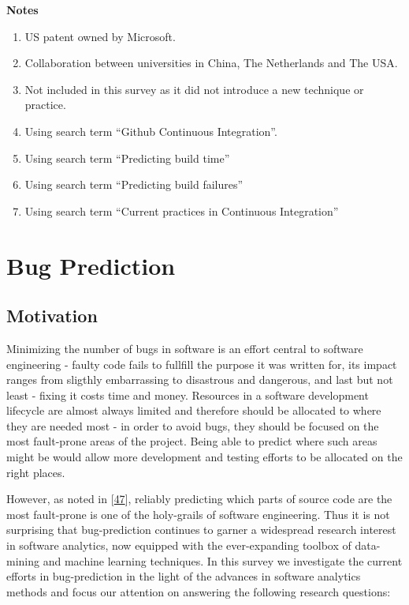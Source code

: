 \documentclass[]{book}
\providecommand{\tightlist}{%
  \setlength{\itemsep}{0pt}\setlength{\parskip}{0pt}}
\begin{document}
\textbf{Notes}

\begin{enumerate}
\def\labelenumi{\arabic{enumi}.}
\tightlist
\item
  US patent owned by Microsoft.
\item
  Collaboration between universities in China, The Netherlands and The
  USA.
\item
  Not included in this survey as it did not introduce a new technique or
  practice.
\item
  Using search term ``Github Continuous Integration''.
\item
  Using search term ``Predicting build time''
\item
  Using search term ``Predicting build failures''
\item
  Using search term ``Current practices in Continuous Integration''
\end{enumerate}

\chapter{Bug Prediction}\label{bug-prediction}

\section{Motivation}\label{motivation-2}

Minimizing the number of bugs in software is an effort central to
software engineering - faulty code fails to fullfill the purpose it was
written for, its impact ranges from sligthly embarrassing to disastrous
and dangerous, and last but not least - fixing it costs time and money.
Resources in a software development lifecycle are almost always limited
and therefore should be allocated to where they are needed most - in
order to avoid bugs, they should be focused on the most fault-prone
areas of the project. Being able to predict where such areas might be
would allow more development and testing efforts to be allocated on the
right places.

However, as noted in {[}\protect\hyperlink{ref-DAmbros2012}{47}{]},
reliably predicting which parts of source code are the most fault-prone
is one of the holy-grails of software engineering. Thus it is not
surprising that bug-prediction continues to garner a widespread research
interest in software analytics, now equipped with the ever-expanding
toolbox of data-mining and machine learning techniques. In this survey
we investigate the current efforts in bug-prediction in the light of the
advances in software analytics methods and focus our attention on
answering the following research questions:
\end{document}
